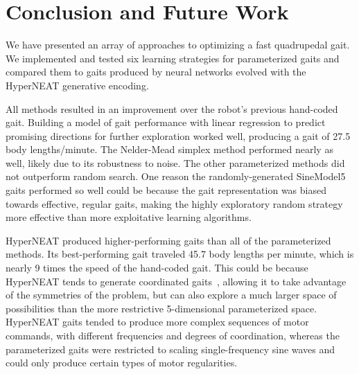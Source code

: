 \section{Conclusion and Future Work}

We have presented an array of approaches to optimizing a fast quadrupedal
gait.  We implemented and tested six learning
strategies for parameterized gaits and compared them to gaits produced by neural networks
evolved with the HyperNEAT generative encoding.

All methods resulted in an improvement over the robot's previous
hand-coded gait.  Building a model of gait
performance with linear regression to predict promising directions for further exploration
worked well, producing a gait of 27.5 body
lengths/minute.  The Nelder-Mead simplex method performed nearly as well, likely due to its robustness to noise.  The other parameterized
methods did not outperform random search.  One reason the randomly-generated SineModel5 gaits performed so well could be because the gait representation was biased towards effective, regular gaits, making the highly exploratory random strategy more effective than more exploitative learning algorithms. 

HyperNEAT produced higher-performing gaits than all of the parameterized
methods. Its best-performing gait traveled 45.7 body lengths per minute, which is nearly 9 times the speed of the hand-coded gait.  This could be because HyperNEAT tends to generate coordinated gaits~\cite{clune2011performance, clune2009evolving}, allowing it to
take advantage of the symmetries of the problem, but can also explore a much larger space of possibilities than the
more restrictive 5-dimensional parameterized space.  HyperNEAT gaits tended to produce more complex sequences of motor commands, with different frequencies and degrees of coordination, whereas the
parameterized gaits were restricted to scaling single-frequency sine waves and could only produce certain types of motor regularities. 
